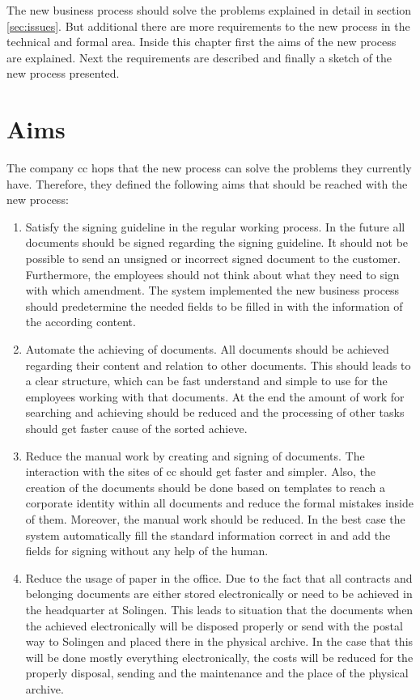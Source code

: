 The new business process should solve the problems explained in detail in section \ref{sec:issues}. But additional there are more requirements to the new process in the technical and formal area. Inside this chapter first the aims of the new process are explained. Next the requirements are described and finally a sketch of the new process presented. 

\section{Aims}
The company \gls{cc} hops that the new process can solve the problems they currently have. Therefore, they defined the following aims that should be reached with the new process:
\begin{enumerate}
	\item Satisfy the signing guideline in the regular working process. \newline
	In the future all documents should be signed regarding the signing guideline. It should not be possible to send an unsigned or incorrect signed document to the customer. Furthermore, the employees should not think about what they need to sign with which amendment. The system implemented the new business process should predetermine the needed fields to be filled in with the information of the according content.
	\item Automate the achieving of documents. \newline
	All documents should be achieved regarding their content and relation to other documents. This should leads to a clear structure, which can be fast understand and simple to use for the employees working with that documents. At the end the amount of work for searching and achieving should be reduced and the processing of other tasks should get faster cause of the sorted achieve.
	\item Reduce the manual work by creating and signing of documents. \newline
	The interaction with the sites of \gls{cc} should get faster and simpler. Also, the creation of the documents should be done based on templates to reach a corporate identity within all documents and reduce the formal mistakes inside of them. Moreover, the manual work should be reduced. In the best case the system automatically fill the standard information correct in and add the fields for signing without any help of the human.  
	\item Reduce the usage of paper in the office. \newline
	Due to the fact that all contracts and belonging documents are either stored electronically or need to be achieved in the headquarter at Solingen. This leads to situation that the documents when the achieved electronically will be disposed properly or send with the postal way to Solingen and placed there in the physical archive. In the case that this will be done mostly everything electronically, the costs will be reduced for the properly disposal, sending and the maintenance and the place of the physical archive. 
\end{enumerate}
